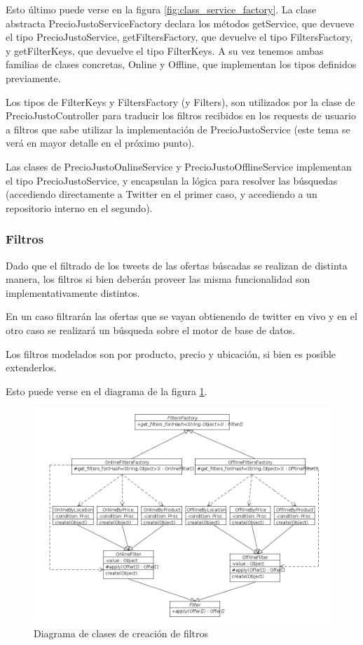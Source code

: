 Esto \'ultimo puede verse en la figura \ref{fig:class_service_factory}. La clase abstracta PrecioJustoServiceFactory declara los m\'etodos getService, que devueve el tipo PrecioJustoService, getFiltersFactory, que devuelve el tipo FiltersFactory, y getFilterKeys, que devuelve el tipo FilterKeys. A su vez tenemos ambas familias de clases concretas, Online y Offline, que implementan los tipos definidos  previamente.

Los tipos de FilterKeys y FiltersFactory (y Filters), son utilizados por la clase de PrecioJustoController para traducir los filtros recibidos en los requests de usuario a filtros que sabe utilizar la implementaci\'on de PrecioJustoService (este tema se ver\'a en mayor detalle en el pr\'oximo punto).

Las clases de PrecioJustoOnlineService y PrecioJustoOfflineService implementan el tipo PrecioJustoService, y encapsulan la l\'ogica para resolver las b\'usquedas (accediendo directamente a Twitter en el primer caso, y accediendo a un repositorio interno en el segundo).


\subsubsection{Filtros}

Dado que el filtrado de los tweets de las ofertas b\'uscadas se realizan de distinta manera, los filtros si bien deber\'an proveer las misma funcionalidad son implementativamente distintos.

En un caso filtrar\'an las ofertas que se vayan obtienendo de twitter en vivo y en el otro caso se realizar\'a un b\'usqueda sobre el motor de base de datos.

Los filtros modelados son por producto, precio y ubicaci\'on, si bien es posible extenderlos.

Esto puede verse en el diagrama de la figura \ref{fig:class_filter_factory}. 

\begin{figure}[h]
\centerline{\includegraphics[width=0.6\paperwidth]{./imgs/class_diagram_filters_factory.png}}
\caption{Diagrama de clases de creaci\'on de filtros}
\label{fig:class_filter_factory} 
\end{figure}


